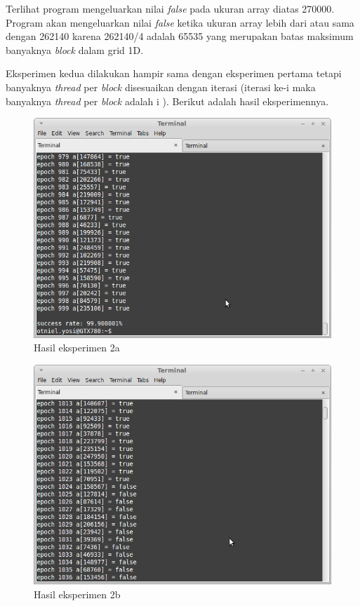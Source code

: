 Terlihat program mengeluarkan nilai \textit{false} pada ukuran array diatas 270000.  Program akan mengeluarkan nilai \textit{false} ketika ukuran array lebih dari atau sama dengan 262140 karena 262140/4 adalah 65535 yang merupakan batas maksimum banyaknya \textit{block} dalam grid 1D.

Eksperimen kedua dilakukan hampir sama dengan eksperimen pertama tetapi banyaknya \textit{thread} per \textit{block} disesuaikan dengan iterasi (iterasi ke-i maka banyaknya \textit{thread} per \textit{block} adalah i ).  Berikut adalah hasil eksperimennya.

\begin{figure}
	\centering
	\includegraphics[width=1\textwidth]
	{pics/incarray_blockvar_1000}
	\caption{Hasil eksperimen 2a}
	\label{fig:inc_demo1}
\end{figure}

\begin{figure}
	\centering
	\includegraphics[width=1\textwidth]
	{pics/incarray_blockvar_1500}
	\caption{Hasil eksperimen 2b}
	\label{fig:inc_demo1}
\end{figure}

